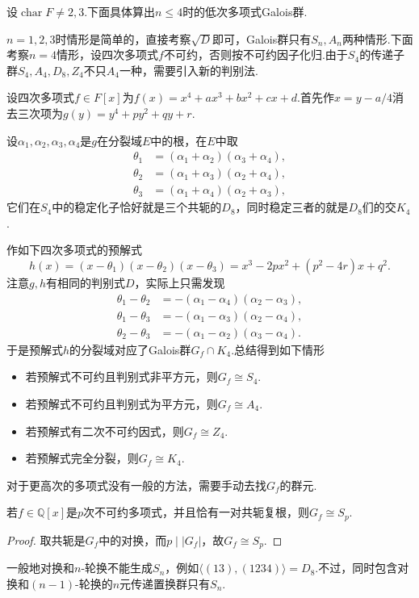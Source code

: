 设$\operatorname*{char}F\ne2,3$.下面具体算出$n\le 4$时的低次多项式Galois群.

$n=1,2,3$时情形是简单的，直接考察$\sqrt D$即可，Galois群只有$S_n,A_n$两种情形.下面考察$n=4$情形，设四次多项式$f$不可约，否则按不可约因子化归.由于$S_4$的传递子群$S_4,A_4,D_8,Z_4$不只$A_4$一种，需要引入新的判别法.

设四次多项式$f\in F[x]$为$f(x)=x^4+ax^3+bx^2+cx+d$.首先作$x=y-a/4$消去三次项为$g(y)=y^4+py^2+qy+r$.

设$\alpha_1,\alpha_2,\alpha_3,\alpha_4$是$g$在分裂域$E$中的根，在$E$中取
\begin{align*}
    \theta_1&=(\alpha_1+\alpha_2)(\alpha_3+\alpha_4),\\
    \theta_2&=(\alpha_1+\alpha_3)(\alpha_2+\alpha_4),\\
    \theta_3&=(\alpha_1+\alpha_4)(\alpha_2+\alpha_3),
\end{align*}
它们在$S_4$中的稳定化子恰好就是三个共轭的$D_8$，同时稳定三者的就是$D_8$们的交$K_4$.

作如下四次多项式的{\heiti 预解式}
\[
    h(x)=(x-\theta_1)(x-\theta_2)(x-\theta_3)=x^3-2px^2+(p^2-4r)x+q^2.
\]
注意$g,h$有相同的判别式$D$，实际上只需发现
\begin{align*}
    \theta_1-\theta_2&=-(\alpha_1-\alpha_4)(\alpha_2-\alpha_3),\\
    \theta_1-\theta_3&=-(\alpha_1-\alpha_3)(\alpha_2-\alpha_4),\\
    \theta_2-\theta_3&=-(\alpha_1-\alpha_2)(\alpha_3-\alpha_4).
\end{align*}
于是预解式$h$的分裂域对应了Galois群$G_f\cap K_4$.总结得到如下情形
\begin{itemize}
    \item 若预解式不可约且判别式非平方元，则$G_f\cong S_4$.
    \item 若预解式不可约且判别式为平方元，则$G_f\cong A_4$.
    \item 若预解式有二次不可约因式，则$G_f\cong Z_4$.
    \item 若预解式完全分裂，则$G_f\cong K_4$.
\end{itemize}

对于更高次的多项式没有一般的方法，需要手动去找$G_f$的群元.
\begin{prop}
    若$f\in\mathbb{Q}[x]$是$p$次不可约多项式，并且恰有一对共轭复根，则$G_f\cong S_p$.
\end{prop}
\begin{proof}
    取共轭是$G_f$中的对换，而$p\mid|G_f|$，故$G_f\cong S_p$.
\end{proof}
\begin{remark}
    一般地对换和$n$-轮换不能生成$S_n$，例如$\langle (13),(1234)\rangle=D_8$.不过，同时包含对换和$(n-1)$-轮换的$n$元传递置换群只有$S_n$.
\end{remark}

